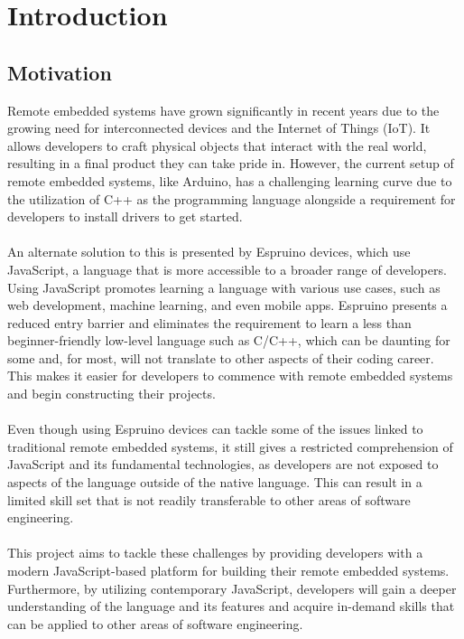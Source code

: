 \documentclass{l4proj}
\begin{document}
\tableofcontents
\listoffigures

\chapter{Introduction}



\section{Motivation}

\text 
Remote embedded systems have grown significantly in recent years due to the growing need for interconnected devices and the Internet of Things (IoT). It allows developers to craft physical objects that interact with the real world, resulting in a final product they can take pride in. However, the current setup of remote embedded systems, like Arduino, has a challenging learning curve due to the utilization of C++ as the programming language alongside a requirement for developers to install drivers to get started.
\\ \\
An alternate solution to this is presented by Espruino devices, which use JavaScript, a language that is more accessible to a broader range of developers. Using JavaScript promotes learning a language with various use cases, such as web development, machine learning, and even mobile apps. Espruino presents a reduced entry barrier and eliminates the requirement to learn a less than beginner-friendly low-level language such as C/C++, which can be daunting for some and, for most, will not translate to other aspects of their coding career. This makes it easier for developers to commence with remote embedded systems and begin constructing their projects.
\\ \\
Even though using Espruino devices can tackle some of the issues linked to traditional remote embedded systems, it still gives a restricted comprehension of JavaScript and its fundamental technologies, as developers are not exposed to aspects of the language outside of the native language. This can result in a limited skill set that is not readily transferable to other areas of software engineering.
\\ \\
This project aims to tackle these challenges by providing developers with a modern JavaScript-based platform for building their remote embedded systems. Furthermore, by utilizing contemporary JavaScript, developers will gain a deeper understanding of the language and its features and acquire in-demand skills that can be applied to other areas of software engineering.
\end{document}
